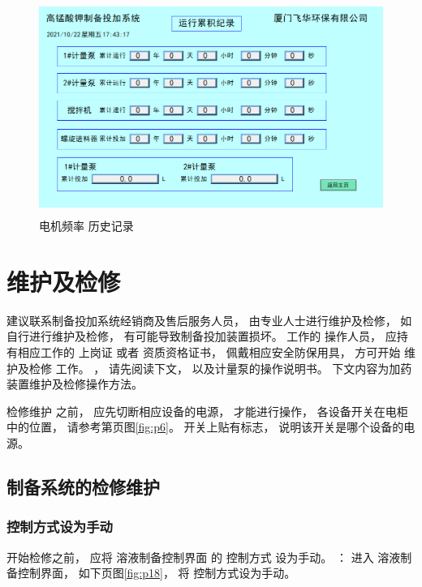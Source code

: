 \documentclass[UTF8,a4paper,12pt,titlepage]{ctexart}
\begin{document}
            \begin{figure}[h]
                \centering
                \includegraphics[height=7cm]{g11.PNG}
                \caption{电机频率 历史记录}\label{fig:p17}
            \end{figure}

\section{维护及检修}
   建议联系制备投加系统经销商及售后服务人员，
   由专业人士进行维护及检修，
   如自行进行维护及检修，
   有可能导致制备投加装置损坏。
    工作的 操作人员，
   应持有相应工作的 上岗证 或者 资质资格证书，
   佩戴相应安全防保用具，
   方可开始 维护及检修 工作。
   ，
   请先阅读下文，
   以及计量泵的操作说明书。
   下文内容为加药装置维护及检修操作方法。

     检修维护 之前，
    应先切断相应设备的电源，
    才能进行操作，
    各设备开关在电柜中的位置， 
    请参考第\pageref{sec:power-on}页图\ref{fig:p6}。
    开关上贴有标志，
    说明该开关是哪个设备的电源。

   \subsection{制备系统的检修维护}

        \subsubsection{控制方式设为手动} 
            开始检修之前，
            应将 溶液制备控制界面 的 控制方式 设为手动。
            ：
            进入 溶液制备控制界面，
            如下页图\ref{fig:p18}，
            将 控制方式设为手动。
\end{document}
